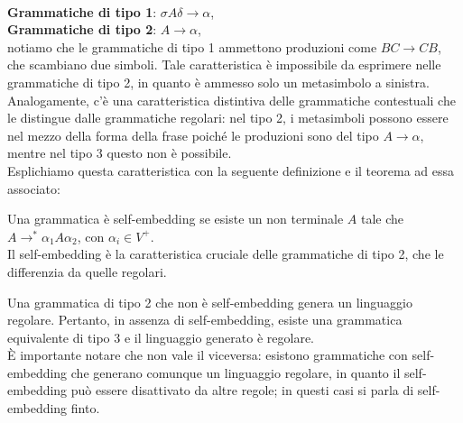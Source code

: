 \documentclass{article}
\begin{document}
\\\noindent
\textbf{Grammatiche di tipo 1}: \( \sigma A \delta \rightarrow \alpha \),
\\\noindent
\textbf{Grammatiche di tipo 2}: \( A \rightarrow \alpha \),
\\\noindent
notiamo che le grammatiche di tipo 1 ammettono produzioni come \( BC \rightarrow CB \), che scambiano due simboli. Tale caratteristica è impossibile da esprimere nelle grammatiche di tipo 2, in quanto è ammesso solo un metasimbolo a sinistra.
\\\noindent
Analogamente, c'è una caratteristica distintiva delle grammatiche contestuali che le distingue dalle grammatiche regolari: nel tipo 2, i metasimboli possono essere nel mezzo della forma della frase poiché le produzioni sono del tipo \( A \rightarrow \alpha \), mentre nel tipo 3 questo non è possibile.
\\Esplichiamo questa caratteristica con la seguente definizione e il teorema ad essa associato:
\\\noindent
\begin{definition}
Una grammatica è self-embedding se esiste un non terminale \( A \) tale che \( A \rightarrow^* \alpha_1 A \alpha_2 \), con \( \alpha_i \in V^+ \).\\Il self-embedding è la caratteristica cruciale delle grammatiche di tipo 2, che le differenzia da quelle regolari.
\end{definition}
\begin{teo}
Una grammatica di tipo 2 che non è self-embedding genera un linguaggio regolare. Pertanto, in assenza di self-embedding, esiste una grammatica equivalente di tipo 3 e il linguaggio generato è regolare. \\\noindent È importante notare che non vale il viceversa: esistono grammatiche con self-embedding che generano comunque un linguaggio regolare, in quanto il self-embedding può essere disattivato da altre regole; in questi casi si parla di self-embedding finto.
\end{teo}
\end{document}
